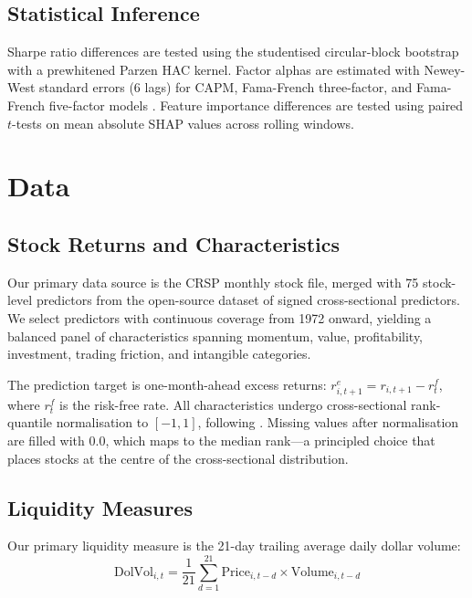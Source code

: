 \documentclass[a4paper,12pt,final]{article}
\begin{document}
\subsection{Statistical Inference}
\label{subsec:inference}

Sharpe ratio differences are tested using the \citet{ledoit2008robust} studentised circular-block bootstrap with a prewhitened Parzen HAC kernel. Factor alphas are estimated with Newey-West standard errors (6 lags) for CAPM, Fama-French three-factor, and Fama-French five-factor models \citep{fama1993common,fama2015five}. Feature importance differences are tested using paired $t$-tests on mean absolute SHAP values across rolling windows.


\section{Data}
\label{sec:data}

\subsection{Stock Returns and Characteristics}
\label{subsec:returns_chars}

Our primary data source is the CRSP monthly stock file, merged with 75 stock-level predictors from the \citet{chen2022open} open-source dataset of signed cross-sectional predictors. We select predictors with continuous coverage from 1972 onward, yielding a balanced panel of characteristics spanning momentum, value, profitability, investment, trading friction, and intangible categories.

The prediction target is one-month-ahead excess returns: $r^e_{i,t+1} = r_{i,t+1} - r^f_t$, where $r^f_t$ is the risk-free rate. All characteristics undergo cross-sectional rank-quantile normalisation to $[-1, 1]$, following \citet{gu2020empirical}. Missing values after normalisation are filled with 0.0, which maps to the median rank---a principled choice that places stocks at the centre of the cross-sectional distribution.

\subsection{Liquidity Measures}
\label{subsec:liquidity_measures}

Our primary liquidity measure is the 21-day trailing average daily dollar volume:
\begin{equation}
\text{DolVol}_{i,t} = \frac{1}{21}\sum_{d=1}^{21} \text{Price}_{i,t-d} \times \text{Volume}_{i,t-d}
\label{eq:dolvol}
\end{equation}
\end{document}

